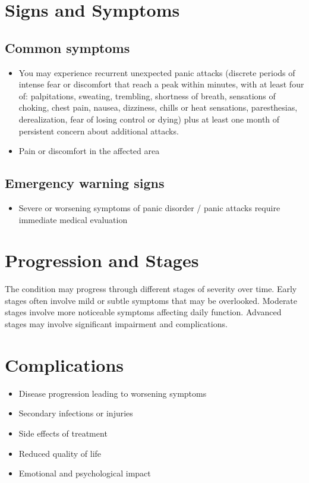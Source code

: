 \section{Signs and Symptoms}
\subsection{Common symptoms}
\begin{itemize}[noitemsep]
  \item You may experience recurrent unexpected panic attacks (discrete periods of intense fear or discomfort that reach a peak within minutes, with at least four of: palpitations, sweating, trembling, shortness of breath, sensations of choking, chest pain, nausea, dizziness, chills or heat sensations, paresthesias, derealization, fear of losing control or dying) plus at least one month of persistent concern about additional attacks.
  \item Pain or discomfort in the affected area
  \end{itemize}
\subsection{Emergency warning signs}
\begin{itemize}[noitemsep]
  \item Severe or worsening symptoms of panic disorder / panic attacks require immediate medical evaluation
\end{itemize}
\section{Progression and Stages}
The condition may progress through different stages of severity over time. Early stages often involve mild or subtle symptoms that may be overlooked. Moderate stages involve more noticeable symptoms affecting daily function. Advanced stages may involve significant impairment and complications.
\section{Complications}
\begin{itemize}[noitemsep]
  \item Disease progression leading to worsening symptoms
  \item Secondary infections or injuries
  \item Side effects of treatment
  \item Reduced quality of life
  \item Emotional and psychological impact
\end{itemize}
